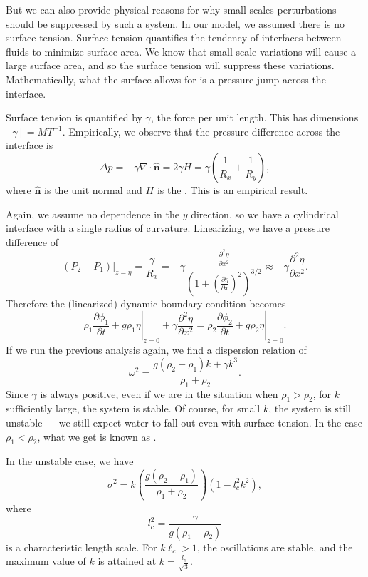 \documentclass[a4paper]{article}
\begin{document}
But we can also provide physical reasons for why small scales perturbations should be suppressed by such a system. In our model, we assumed there is no surface tension. Surface tension quantifies the tendency of interfaces between fluids to minimize surface area. We know that small-scale variations will cause a large surface area, and so the surface tension will suppress these variations. Mathematically, what the surface allows for is a pressure jump across the interface.

Surface tension is quantified by $\gamma$, the force per unit length. This has dimensions $[\gamma] = MT^{-1}$. Empirically, we observe that the pressure difference across the interface is
\[
  \Delta p = - \gamma \nabla \cdot \hat{\mathbf{n}} = 2 \gamma H = \gamma \left(\frac{1}{R_x} + \frac{1}{R_y}\right),
\]
where $\hat{\mathbf{n}}$ is the unit normal and $H$ is the . This is an empirical result.

Again, we assume no dependence in the $y$ direction, so we have a cylindrical interface with a single radius of curvature. Linearizing, we have a pressure difference of
\[
  (P_2 - P_1) |_{z = \eta} = \frac{\gamma}{R_x} = - \gamma \frac{\frac{\partial^2 \eta}{\partial x^2}}{\left(1 + \left(\frac{\partial \eta}{\partial x}\right)^2\right)^{3/2}} \approx -\gamma \frac{\partial^2 \eta}{\partial x^2}.
\]
Therefore the (linearized) dynamic boundary condition becomes
\[
  \left.\rho_1 \frac{\partial \phi_1}{\partial t} + g \rho_1 \eta\right|_{z =0 } + \gamma \frac{\partial^2 \eta}{\partial x^2} = \left. \rho_2 \frac{\partial \phi_2}{\partial t} + g \rho_2 \eta\right|_{z = 0}.
\]
If we run the previous analysis again, we find a dispersion relation of
\[
  \omega^2 = \frac{g(\rho_2 - \rho_1)k + \gamma k^3}{\rho_1 + \rho_2}.
\]
Since $\gamma$ is always positive, even if we are in the situation when $\rho_1 > \rho_2$, for $k$ sufficiently large, the system is stable. Of course, for small $k$, the system is still unstable --- we still expect water to fall out even with surface tension. In the case $\rho_1 < \rho_2$, what we get is known as .

In the unstable case, we have
\[
  \sigma^2 = k \left(\frac{g(\rho_2 - \rho_1)}{\rho_1 + \rho_2}\right) (1 - l_c^2 k^2),
\]
where
\[
  l_c^2 = \frac{\gamma}{g (\rho_1 - \rho_2)}
\]
is a characteristic length scale. For $k \ell_c > 1$, the oscillations are stable, and the maximum value of $k$ is attained at $k = \frac{l_c}{\sqrt{3}}$.
\end{document}
